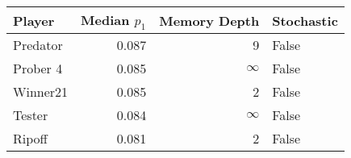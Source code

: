 \begin{tabular}{lrrl}
\toprule
   Player &  Median $p_1$ &  Memory Depth & Stochastic \\
\midrule
 Predator &         0.087 &             9 &      False \\
 Prober 4 &         0.085 &            \(\infty\) &      False \\
 Winner21 &         0.085 &             2 &      False \\
   Tester &         0.084 &            \(\infty\) &      False \\
   Ripoff &         0.081 &             2 &      False \\
\bottomrule
\end{tabular}
